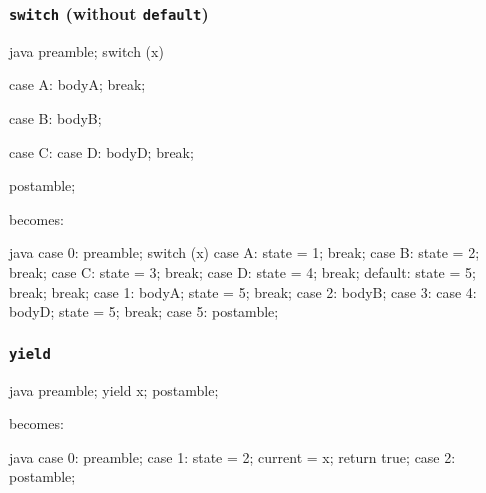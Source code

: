 \documentclass[journal,a4paper]{IEEEtran}
\begin{document}
\subsubsection{\texttt{switch} (without \texttt{default})}

\begin{pygmented}{java}
preamble;
switch (x) {
    case A:
        bodyA;
        break;

    case B:
        bodyB;

    case C:
    case D:
        bodyD;
        break;
}
postamble;
\end{pygmented}

becomes:

\begin{pygmented}{java}
case 0:
    preamble;
    switch (x) {
        case A:
            state = 1;
            break;
        case B:
            state = 2;
            break;
        case C:
            state = 3;
            break;
        case D:
            state = 4;
            break;
        default:
            state = 5;
            break;
    }
    break;
case 1:
    bodyA;
    state = 5;
    break;
case 2:
    bodyB;
case 3:
case 4:
    bodyD;
    state = 5;
    break;
case 5:
    postamble;
\end{pygmented}

\subsubsection{\texttt{yield}}

\begin{pygmented}{java}
preamble;
yield x;
postamble;
\end{pygmented}

becomes:

\begin{pygmented}{java}
case 0:
    preamble;
case 1:
    state = 2;
    current = x;
    return true;
case 2:
    postamble;
\end{pygmented}
\end{document}
